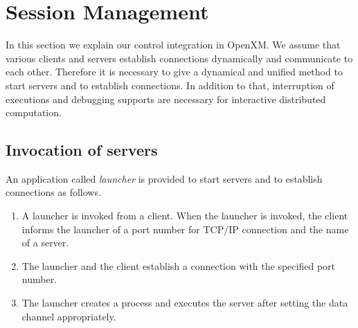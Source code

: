 
\section{Session Management}
\label{secsession}
 
In this section we explain our control integration in
OpenXM.  We assume that various clients and servers
establish connections dynamically and communicate to each
other. Therefore it is necessary to give a dynamical and unified
method to start servers and to establish connections.
In addition to that, interruption of executions and debugging
supports are necessary for interactive distributed computation.

%

\subsection{Invocation of servers}
\label{launcher}

An application called {\it launcher} is provided to start servers
and to establish connections as follows.

\begin{enumerate}
\item A launcher is invoked from a client.
When the launcher is invoked, the client 
informs the launcher of a port number for TCP/IP connection
and the name of a server.
\item The launcher and the client establish a connection with the
specified port number.
\item The launcher creates a process and executes the server after
setting the data channel appropriately.
\end{enumerate}


